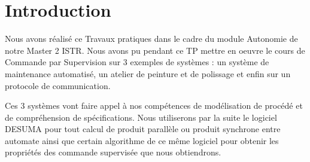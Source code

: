 \chapter*{Introduction}
\label{chap:Intro}
Nous avons réalisé ce Travaux pratiques dans le cadre du module Autonomie de notre Master 2 ISTR. Nous avons pu pendant ce TP mettre en oeuvre le cours de Commande par Supervision sur 3 exemples de systèmes : un système de maintenance automatisé, un atelier de peinture et de polissage et enfin sur un protocole de communication. 

Ces 3 systèmes vont faire appel à nos compétences de modélisation de procédé et de compréhension de spécifications. Nous utiliserons par la suite le logiciel DESUMA pour tout calcul de produit parallèle ou produit synchrone entre automate ainsi que certain algorithme de ce même logiciel pour obtenir les propriétés des commande supervisée que nous obtiendrons.